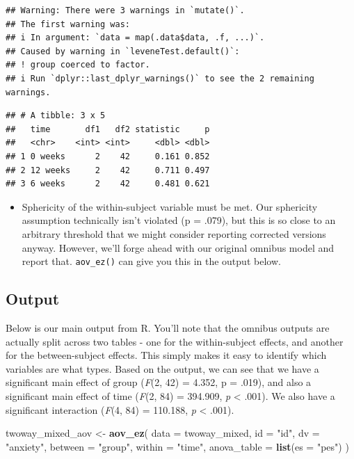 \documentclass[
]{book}
\newenvironment{Shaded}{\begin{snugshade}}{\end{snugshade}}
\newcommand{\AttributeTok}[1]{\textcolor[rgb]{0.13,0.29,0.53}{#1}}
\newcommand{\FunctionTok}[1]{\textcolor[rgb]{0.13,0.29,0.53}{\textbf{#1}}}
\newcommand{\NormalTok}[1]{#1}
\newcommand{\OtherTok}[1]{\textcolor[rgb]{0.56,0.35,0.01}{#1}}
\newcommand{\StringTok}[1]{\textcolor[rgb]{0.31,0.60,0.02}{#1}}
\providecommand{\tightlist}{%
  \setlength{\itemsep}{0pt}\setlength{\parskip}{0pt}}
\begin{document}
\begin{verbatim}
## Warning: There were 3 warnings in `mutate()`.
## The first warning was:
## i In argument: `data = map(.data$data, .f, ...)`.
## Caused by warning in `leveneTest.default()`:
## ! group coerced to factor.
## i Run `dplyr::last_dplyr_warnings()` to see the 2 remaining warnings.
\end{verbatim}

\begin{verbatim}
## # A tibble: 3 x 5
##   time       df1   df2 statistic     p
##   <chr>    <int> <int>     <dbl> <dbl>
## 1 0 weeks      2    42     0.161 0.852
## 2 12 weeks     2    42     0.711 0.497
## 3 6 weeks      2    42     0.481 0.621
\end{verbatim}

\begin{itemize}
\tightlist
\item
  Sphericity of the within-subject variable must be met. Our sphericity assumption technically isn't violated (p = .079), but this is so close to an arbitrary threshold that we might consider reporting corrected versions anyway. However, we'll forge ahead with our original omnibus model and report that. \texttt{aov\_ez()} can give you this in the output below.
\end{itemize}

\hypertarget{output-9}{%
\subsection{Output}\label{output-9}}

Below is our main output from R. You'll note that the omnibus outputs are actually split across two tables - one for the within-subject effects, and another for the between-subject effects. This simply makes it easy to identify which variables are what types. Based on the output, we can see that we have a significant main effect of group (\emph{F}(2, 42) = 4.352, p = .019), and also a significant main effect of time (\emph{F}(2, 84) = 394.909, \emph{p} \textless{} .001). We also have a significant interaction (\emph{F}(4, 84) = 110.188, \emph{p} \textless{} .001).

\begin{Shaded}
\begin{Highlighting}[]
\NormalTok{twoway\_mixed\_aov }\OtherTok{\textless{}{-}} \FunctionTok{aov\_ez}\NormalTok{(}
  \AttributeTok{data =}\NormalTok{ twoway\_mixed,}
  \AttributeTok{id =} \StringTok{"id"}\NormalTok{,}
  \AttributeTok{dv =} \StringTok{"anxiety"}\NormalTok{,}
  \AttributeTok{between =} \StringTok{"group"}\NormalTok{,}
  \AttributeTok{within =} \StringTok{"time"}\NormalTok{,}
  \AttributeTok{anova\_table =} \FunctionTok{list}\NormalTok{(}\AttributeTok{es =} \StringTok{"pes"}\NormalTok{)}
\NormalTok{)}
\end{Highlighting}
\end{Shaded}
\end{document}
